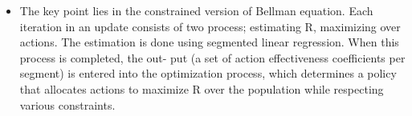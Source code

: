 \documentclass{article}
\theoremstyle{remark}
\theoremstyle{remark}
\theoremstyle{remark}
\theoremstyle{remark}
\theoremstyle{remark}
\theoremstyle{remark}
\begin{document}
\begin{itemize}
	\item The key point lies in the constrained version of Bellman equation. Each iteration in an update consists of two process; estimating R, maximizing over actions. The estimation is done using segmented linear regression. When this process is completed, the out- put (a set of action effectiveness coefficients per segment) is entered into the optimization process, which determines a policy that allocates actions to maximize R over the population while respecting various constraints.
	

\end{itemize}




\end{document}
